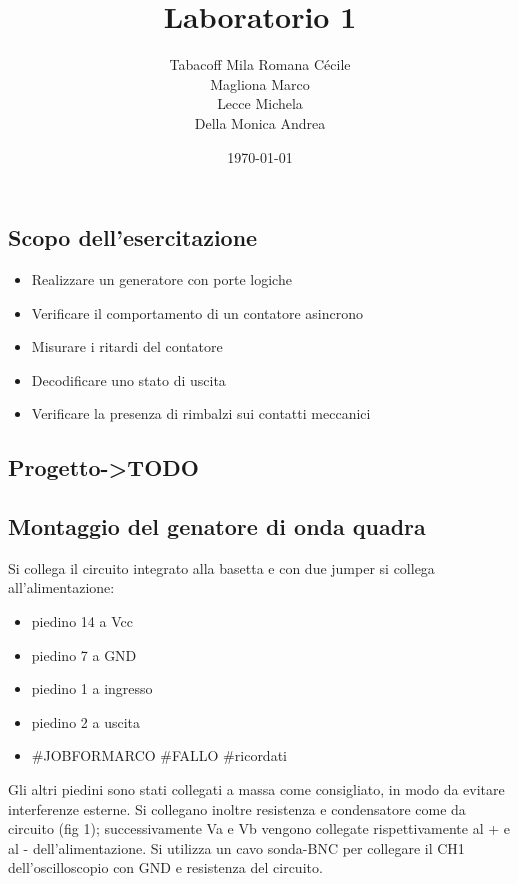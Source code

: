 \documentclass[a4paper]{article}
\begin{document}
\title{Laboratorio 1}
\author{
        Tabacoff Mila Romana Cécile \\
        Magliona Marco \\
        Lecce Michela \\
        Della Monica Andrea}

\date{\today}
\maketitle

\newpage

\begin{tcolorbox}[breakable,colback=cyan,colframe=cyan]
\section*{Scopo dell'esercitazione}
\end{tcolorbox}

\begin{itemize}
\item Realizzare un generatore con porte logiche
\item Verificare il comportamento di un contatore asincrono
\item Misurare i ritardi del contatore
\item Decodificare uno stato di uscita
\item Verificare la presenza di rimbalzi sui contatti meccanici
\end{itemize}

\begin{tcolorbox}[breakable,colback=cyan,colframe=cyan]
\section*{Progetto->TODO}
\end{tcolorbox}


\begin{tcolorbox}[breakable,colback=cyan,colframe=cyan]
\section*{Montaggio del genatore di onda quadra}
\end{tcolorbox}

Si collega il circuito integrato alla basetta e con due jumper si collega all'alimentazione:
\begin{itemize}
\item piedino 14 a Vcc
\item piedino 7 a GND
\item piedino 1 a ingresso
\item piedino 2 a uscita
\item #JOBFORMARCO #FALLO #ricordati
\end{itemize}
Gli altri piedini sono stati collegati a massa come consigliato, in modo da evitare interferenze esterne.
Si collegano inoltre resistenza e condensatore come da circuito (fig 1); successivamente Va e Vb vengono collegate rispettivamente al + e al - dell'alimentazione.
Si utilizza un cavo sonda-BNC per collegare il CH1 dell'oscilloscopio con GND e resistenza del circuito.
\end{document}
